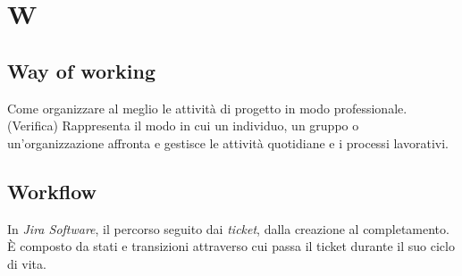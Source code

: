 \chapter{W}

\section{Way of working}
Come organizzare al meglio le attività di progetto in modo professionale.
(Verifica) Rappresenta il modo in cui un individuo, un gruppo o un'organizzazione affronta e gestisce le attività quotidiane e i processi lavorativi. 

\section{Workflow}
In \emph{Jira Software}, il percorso seguito dai \emph{ticket}, dalla creazione al completamento. È composto da stati e transizioni attraverso cui passa il ticket durante il suo ciclo di vita.